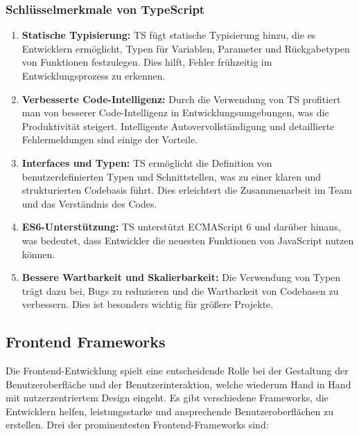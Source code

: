 \subsubsection{Schlüsselmerkmale von TypeScript}

\begin{enumerate}
    \item \textbf{Statische Typisierung:} \acl{TS} fügt statische Typisierung hinzu, die es Entwicklern ermöglicht, Typen für Variablen, Parameter und Rückgabetypen von Funktionen festzulegen. Dies hilft, Fehler frühzeitig im Entwicklungsprozess zu erkennen.

    \item \textbf{Verbesserte Code-Intelligenz:} Durch die Verwendung von \acl{TS} profitiert man von besserer Code-Intelligenz in Entwicklungsumgebungen, was die Produktivität steigert. Intelligente Autovervollständigung und detaillierte Fehlermeldungen sind einige der Vorteile.

    \item \textbf{Interfaces und Typen:} \acl{TS} ermöglicht die Definition von benutzerdefinierten Typen und Schnittstellen, was zu einer klaren und strukturierten Codebasis führt. Dies erleichtert die Zusammenarbeit im Team und das Verständnis des Codes.

    \item \textbf{ES6-Unterstützung:} \acl{TS} unterstützt ECMAScript 6 und darüber hinaus, was bedeutet, dass Entwickler die neuesten Funktionen von JavaScript nutzen können.

    \item \textbf{Bessere Wartbarkeit und Skalierbarkeit:} Die Verwendung von Typen trägt dazu bei, Bugs zu reduzieren und die Wartbarkeit von Codebasen zu verbessern. Dies ist besonders wichtig für größere Projekte.
\end{enumerate}

\subsection{Frontend Frameworks}
\label{chapter:3-frontend-frameworks}

Die Frontend-Entwicklung spielt eine entscheidende Rolle bei der Gestaltung der Benutzeroberfläche und der Benutzerinteraktion, welche wiederum Hand in Hand mit nutzerzentriertem Design eingeht. Es gibt verschiedene Frameworks, die Entwicklern helfen, leistungsstarke und ansprechende Benutzeroberflächen zu erstellen. Drei der prominentesten Frontend-Frameworks sind:

